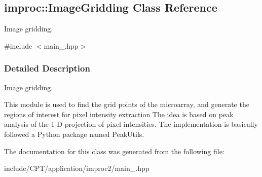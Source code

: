 \hypertarget{classimproc_1_1_image_gridding}{\subsection{improc\-:\-:Image\-Gridding Class Reference}
\label{classimproc_1_1_image_gridding}
}


Image gridding.  




{\ttfamily \#include $<$main\-\_\-.\-hpp$>$}



\subsubsection{Detailed Description}
Image gridding. 

This module is used to find the grid points of the microarray, and generate the regions of interest for pixel intensity extraction The idea is based on peak analysis of the 1-\/\-D projection of pixel intensities. The implementation is basically followed a Python package named Peak\-Utils. 

The documentation for this class was generated from the following file\-:\begin{DoxyCompactItemize}
\item 
include/\-C\-P\-T/application/improc2/main\-\_\-.\-hpp\end{DoxyCompactItemize}
